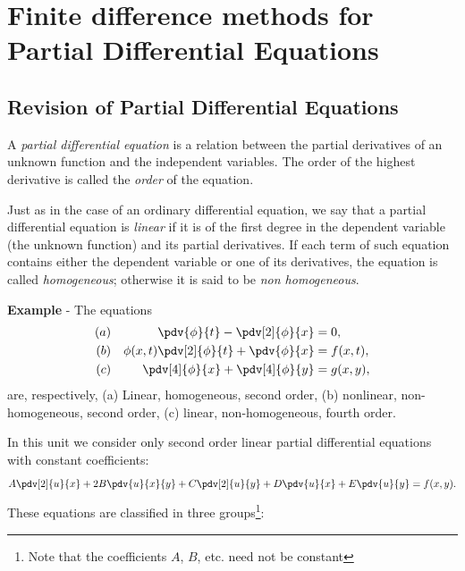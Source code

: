 
\chapter[Partial Differential Equations]{Finite difference methods for Partial Differential Equations}

\section[Revision]{Revision of Partial Differential Equations}

A {\em partial differential equation} is a relation between the
partial derivatives of an unknown function and the independent
variables.  The order of the highest derivative is called the {\em
  order} of the equation.

Just as in the case of an ordinary differential equation, we say that
a partial differential equation is {\em linear} if it is of the first
degree in the dependent variable (the unknown function) and its
partial derivatives.  If each term of such equation contains either
the dependent variable or one of its derivatives, the equation is
called {\em homogeneous}; otherwise it is said to be {\em non
  homogeneous}.

\smallskip

\noindent
{\bf Example} - The equations
%
\begin{align*}
  (a) & & \pdv{\phi}{t} - \pdv[2]{\phi}{x} &= 0, \\
  (b) & & \phi(x,t) \pdv[2]{\phi}{t} + \pdv{\phi}{x} &= f(x,t), \\
  (c) & & \pdv[4]{\phi}{x} + \pdv[4]{\phi}{y} &= g(x,y) ,
\end{align*}
%
are, respectively, (a) Linear, homogeneous, second order, (b)
nonlinear, non-homogeneous, second order, (c) linear, non-homogeneous,
fourth order.

\smallskip

In this unit we consider only second order linear partial differential
equations with constant coefficients:
%
\begin{equation*}
  A \pdv[2]{u}{x} + 2 B \pdv{u}{x}{y} +
  C \pdv[2]{u}{y} + D \pdv{u}{x} + E \pdv{u}{y} = f(x,y) .
\end{equation*}
%
These equations are classified in three groups\footnote{Note that the
  coefficients $A$, $B$, etc. need not be constant}:

\medskip

